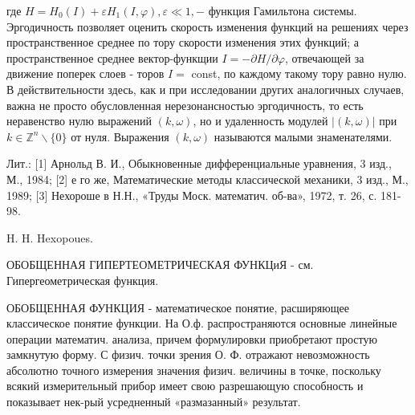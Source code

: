 \documentclass[10pt]{article}
\begin{document}
где $H=H_{0}(I)+\varepsilon H_{1}(I, \varphi), \varepsilon \ll 1,-$ функция Гамильтона системы. Эргодичность позволяет оценить скорость изменения функций на решениях через пространственное среднее по тору скорости изменения этих функций; а пространственное среднее вектор-функщии $I=-\partial H / \partial \varphi$, отвечающей за движение поперек слоев - торов $I=$ const, по каждому такому тору равно нулю. В действительности здесь, как и при исследовании других аналогичных случаев, важна не просто обусловленная нерезонансностью эргодичность, то есть неравенство нулю выражений $(k, \omega)$, но и удаленность модулей $|(k, \omega)|$ при $k \in \mathbb{Z}^{n} \backslash\{0\}$ от нуля. Выражения $(k, \omega)$ называются малыми знаменателями.



Лит.: [1] Арнольд В. И., Обыкновенные дифференциальные уравнения, 3 изд., М., 1984; [2] е го же, Математические методы классической механики, 3 изд., М., 1989; [3] Нехороше в Н.Н., «Труды Моск. математич. об-ва», 1972, т. 26, с. 181-98.



H. H. Hexopoues.



ОБОБЩЕННАЯ ГИПЕРТЕОМЕТРИЧЕСКАЯ ФУНКЦиЯ - см. Гипергеометрическая функция.



ОБОБЩЕННАЯ ФУНКЦИЯ - математическое понятие, расширяющее классическое понятие функции. На О.ф. распространяются основные линейные операции математич. анализа, причем формулировки приобретают простую замкнутую форму. С физич. точки зрения О. Ф. отражают невозможность абсолютно точного измерения значения физич. величины в точке, поскольку всякий измерительный прибор имеет свою разрешающую способность и показывает нек-рый усредненный «размазанный» результат.
\end{document}
